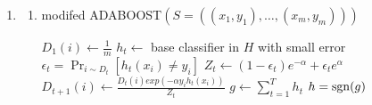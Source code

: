 \documentclass[a4paper]{article}
\begin{document}
\begin{enumerate}[label=\arabic*.]
  \setlength{\itemsep}{3\parskip}
  \item 
     \begin{enumerate}[label*=\arabic*.]
     \item 
    \begin{algorithm}
    \caption{modifed ADABOOST$(S=((x_1,y_1),\dots,(x_m,y_m)))$}\label{alg}
    \begin{algorithmic}[1]
    \STATE $D_1(i)\leftarrow \frac{1}{m}$
    \ENDFOR
    \STATE $h_t \leftarrow$ base classifier in $H$ with small error $\epsilon_t=\Pr_{i\sim D_t}[h_t(x_i)\neq y_i]$
    \STATE $Z_t \leftarrow (1-\epsilon_t)e^{-\alpha}+\epsilon_t e^{\alpha}$    
    \STATE $D_{t+1}(i)\leftarrow \frac{D_t(i)exp(-\alpha y_i h_t(x_i))}{Z_t}$    
    \ENDFOR        
    \ENDFOR    
    \STATE $g\leftarrow \sum_{t=1}^T h_t$
    \RETURN $h=\operatorname{sgn}(g)$        
    \end{algorithmic}
    \end{algorithm}


\end{enumerate}
\end{enumerate}
\end{document}
